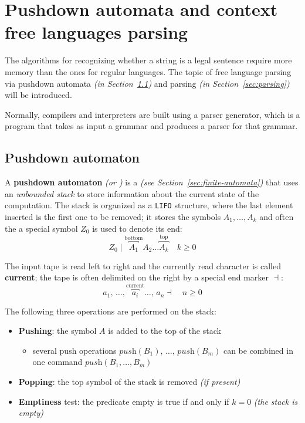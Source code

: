 \documentclass[english]{article}
\begin{document}
\clearpage

\section{Pushdown automata and context free languages parsing}

The algorithms for recognizing whether a string is a legal sentence require more memory than the ones for regular languages.
The topic of free language parsing via pushdown automata \textit{(in Section~\ref{sec:pushdown-automaton})} and parsing \textit{(in Section~\ref{sec:parsing})} will be introduced.

Normally, compilers and interpreters are built using a parser generator, which is a program that takes as input a grammar and produces a parser for that grammar.

\subsection{Pushdown automaton}
\label{sec:pushdown-automaton}

A \textbf{pushdown automaton} \textit{(or \PDA)} is a \FSA \textit{(see Section~\ref{sec:finite-automata})} that uses an \textit{unbounded stack} to store information about the current state of the computation.
The stack is organized as a \texttt{LIFO} structure, where the last element inserted is the first one to be removed;
it stores the symbols \(A_1, \ldots, A_k\) and often the a special symbol \(Z_0\) is used to denote its end:
\[ Z_0 \mid \overbracket{A_1}^\text{bottom} A_2 \ldots \overbracket{A_k}^\text{top} \quad k \geq 0\]

The input tape is read left to right and the currently read character is called \textbf{current}; the tape is often delimited on the right by a special end marker \(\dashv\):
\[ a_1, \, \ldots, \overbracket{a_i}^{\text{current}} \ldots, \, a_n \dashv \quad n \geq 0 \]

The following three operations are performed on the stack:

\begin{itemize}
  \item \textbf{Pushing}: the symbol \(A\) is added to the top of the stack
        \begin{itemize}[label=\(\rightarrow\)]
          \item several push operations \(\textit{push}(B_1), \, \ldots, \, \textit{push}(B_m)\) can be combined in one command \(\textit{push}(B_1, \ldots, B_m)\)
        \end{itemize}
  \item \textbf{Popping}: the top symbol of the stack is removed \textit{(if present)}
  \item \textbf{Emptiness} test: the predicate empty is true if and only if \(k=0\) \textit{(the stack is empty)}
\end{itemize}
\end{document}
